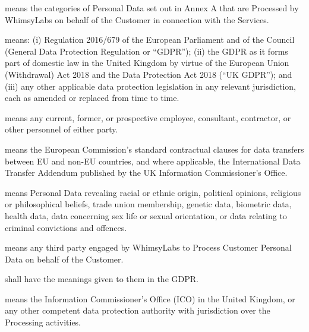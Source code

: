 \documentclass[11pt,a4paper]{article}
\begin{document}
\begin{description}[style=nextline, leftmargin=1cm, font=\normalfont]
    \item[``Customer Personal Data''] means the categories of Personal Data set out in Annex A that are Processed by WhimsyLabs on behalf of the Customer in connection with the Services.
    
    \item[``Data Protection Laws''] means: (i) Regulation 2016/679 of the European Parliament and of the Council (General Data Protection Regulation or ``GDPR''); (ii) the GDPR as it forms part of domestic law in the United Kingdom by virtue of the European Union (Withdrawal) Act 2018 and the Data Protection Act 2018 (``UK GDPR''); and (iii) any other applicable data protection legislation in any relevant jurisdiction, each as amended or replaced from time to time.
    
    \item[``Personnel''] means any current, former, or prospective employee, consultant, contractor, or other personnel of either party.
    
    \item[``SCCs''] means the European Commission's standard contractual clauses for data transfers between EU and non-EU countries, and where applicable, the International Data Transfer Addendum published by the UK Information Commissioner's Office.
    
    \item[``Sensitive Data''] means Personal Data revealing racial or ethnic origin, political opinions, religious or philosophical beliefs, trade union membership, genetic data, biometric data, health data, data concerning sex life or sexual orientation, or data relating to criminal convictions and offences.
    
    \item[``Sub-processor''] means any third party engaged by WhimsyLabs to Process Customer Personal Data on behalf of the Customer.
    
    \item[``Controller'', ``Data Subject'', ``Personal Data'', ``Personal Data Breach'', ``Processing'', ``Processor''] shall have the meanings given to them in the GDPR.
    
    \item[``Supervisory Authority''] means the Information Commissioner's Office (ICO) in the United Kingdom, or any other competent data protection authority with jurisdiction over the Processing activities.
\end{description}
\end{document}
